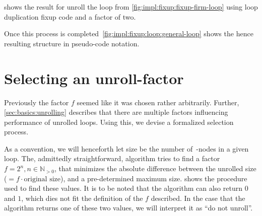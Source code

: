  shows the result for unroll the loop from \cref{fig:impl:fixup:fixup-firm-loop} using loop duplication fixup code and a factor of two.





Once this process is completed~\cref{fig:impl:fixup:loop:general-loop} shows the hence resulting structure in pseudo-code notation.



\section{Selecting an unroll-factor}\label{sec:impl:sel-factor}

Previously the factor $f$ seemed like it was chosen rather arbitrarily.
Further, \cref{sec:basics:unrolling} describes that there are multiple factors influencing performance of unrolled loops.
Using this, we devise a formalized selection process.

As a convention, we will henceforth let size be the number of~\libFIRM-nodes in a given loop.
The, admittedly straightforward, algorithm tries to find a factor $f = 2^n, n \in \mathbb{N}_{>0}$, that minimizes the absolute difference between the unrolled size ($= f \cdot \text{original size}$), and a pre-determined maximum size.
 shows the procedure used to find these values.
It is to be noted that the algorithm can also return $0$ and $1$, which dies not fit the definition of the $f$ described.
In the case that the algorithm returns one of these two values, we will interpret it as ``do not unroll''.

